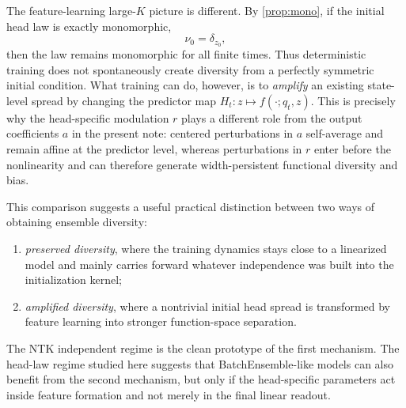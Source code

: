 \documentclass{article}
\theoremstyle{definition}
\begin{document}
The feature-learning large-$K$ picture is different. By
\cref{prop:mono}, if the initial head law is exactly monomorphic,
\[
  \nu_0=\delta_{z_0},
\]
then the law remains monomorphic for all finite times. Thus deterministic
training does not spontaneously create diversity from a perfectly symmetric
initial condition. What training can do, however, is to \emph{amplify} an
existing state-level spread by changing the predictor map
$H_t:z\mapsto f(\cdot;q_t,z)$. This is precisely why the head-specific
modulation $r$ plays a different role from the output coefficients $a$ in the
present note: centered perturbations in $a$ self-average and remain affine at
the predictor level, whereas perturbations in $r$ enter before the nonlinearity
and can therefore generate width-persistent functional diversity and bias.

This comparison suggests a useful practical distinction between two ways of
obtaining ensemble diversity:
\begin{enumerate}[leftmargin=2em]
  \item \emph{preserved diversity}, where the training dynamics stays close to a
  linearized model and mainly carries forward whatever independence was built
  into the initialization kernel;
  \item \emph{amplified diversity}, where a nontrivial initial head spread is
  transformed by feature learning into stronger function-space separation.
\end{enumerate}
The NTK independent regime is the clean prototype of the first mechanism. The
head-law regime studied here suggests that BatchEnsemble-like models can also
benefit from the second mechanism, but only if the head-specific parameters act
inside feature formation and not merely in the final linear readout.
\end{document}
